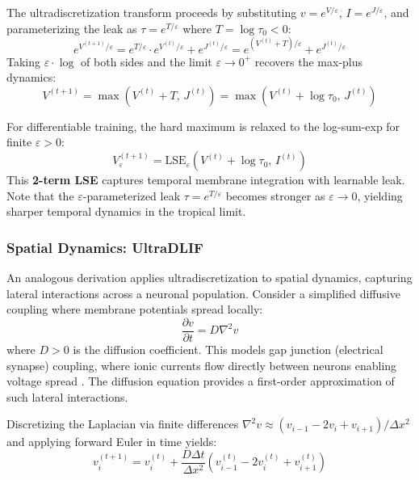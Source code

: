\documentclass{article}
\theoremstyle{plain}
\theoremstyle{definition}
\theoremstyle{remark}
\newcommand{\lse}{\mathrm{LSE}}
\newcommand{\eps}{\varepsilon}
\begin{document}
The ultradiscretization transform \citep{tokihiro1996ultra} proceeds by substituting $v = e^{V/\eps}$, $I = e^{J/\eps}$, and parameterizing the leak as $\tau = e^{T/\eps}$ where $T = \log\tau_0 < 0$:
\begin{equation}
e^{V^{(t+1)}/\eps} = e^{T/\eps} \cdot e^{V^{(t)}/\eps} + e^{J^{(t)}/\eps} = e^{(V^{(t)} + T)/\eps} + e^{J^{(t)}/\eps}
\end{equation}
Taking $\eps \cdot \log$ of both sides and the limit $\eps \to 0^+$ recovers the max-plus dynamics:
\begin{equation}
V^{(t+1)} = \max\left(V^{(t)} + T, \, J^{(t)}\right) = \max\left(V^{(t)} + \log\tau_0, \, J^{(t)}\right)
\label{eq:ultralif_limit}
\end{equation}

For differentiable training, the hard maximum is relaxed to the log-sum-exp for finite $\eps > 0$:
\begin{equation}
V_\eps^{(t+1)} = \lse_\eps\left(V^{(t)} + \log\tau_0, \, I^{(t)}\right)
\label{eq:ultralif_soft}
\end{equation}
This \textbf{2-term LSE} captures temporal membrane integration with learnable leak. Note that the $\eps$-parameterized leak $\tau = e^{T/\eps}$ becomes stronger as $\eps \to 0$, yielding sharper temporal dynamics in the tropical limit.

\subsubsection{Spatial Dynamics: UltraDLIF}
\label{sec:ultradlif_spatial}

An analogous derivation applies ultradiscretization to spatial dynamics, capturing lateral interactions across a neuronal population. Consider a simplified diffusive coupling where membrane potentials spread locally:
\begin{equation}
\frac{\partial v}{\partial t} = D \nabla^2 v
\label{eq:nf_pde}
\end{equation}
where $D > 0$ is the diffusion coefficient. This models gap junction (electrical synapse) coupling, where ionic currents flow directly between neurons enabling voltage spread \citep{connors2004electrical, spek2020neural}. The diffusion equation provides a first-order approximation of such lateral interactions.

Discretizing the Laplacian via finite differences $\nabla^2 v \approx (v_{i-1} - 2v_i + v_{i+1})/\Delta x^2$ and applying forward Euler in time yields:
\begin{equation}
v_i^{(t+1)} = v_i^{(t)} + \frac{D \Delta t}{\Delta x^2}(v_{i-1}^{(t)} - 2v_i^{(t)} + v_{i+1}^{(t)})
\label{eq:nf_discrete}
\end{equation}
\end{document}
